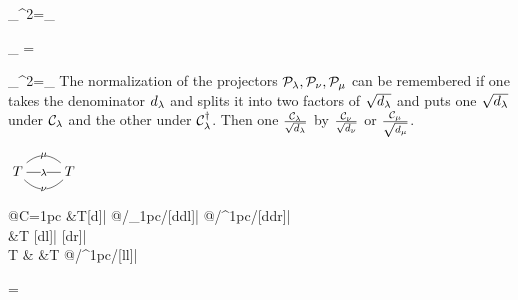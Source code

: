 \beq
\calp_\nu^2=\calp_\nu
\eeq



\beq
{\color{green}\calp_\mu}
=
\bcen
{}
\ecen
\eeq

\beq
\calp_\mu^2=\calp_\mu
\eeq
The normalization of the projectors ${\cal P}_\lambda, {\cal P}_\nu, {\cal P}_\mu$ can be remembered if 
one takes the denominator $d_\lambda$ and splits it into two factors of $\sqrt{d_\lambda}$
and puts one $\sqrt{d_\lambda}$
under ${\cal C}_\lambda$
and the other under ${\cal C}^\dagger_\lambda$. Then
one  $\frac{{\cal C}_\lambda}{\sqrt{d_\lambda}}$
by
$\frac{{\cal C}_\nu}{\sqrt{d_\nu}}$
or
$\frac{{\cal C}_\mu}{\sqrt{d_\mu}}$.


\newcommand{\trij}[3]{
\xymatrix{
T
\ar@{-}@/^1pc/[r]|#1
\ar@{-}@/_1pc/[r]|#3
&T\ar@{-}[l]|#2
}
}

$
\trij{\mu}{\lam}{\nu}
$

\newcommand{\sixj}[6]{
\xymatrix@R=1pc@C=1pc{
&T\ar@{-}[d]|#1
\ar@{-}@/_1pc/[ddl]|#6
\ar@{-}@/^1pc/[ddr]|#5
\\
&T
\ar@{-}[dl]|#2
\ar@{-}[dr]|#3
\\
T
&
&T
\ar@{-}@/^1pc/[ll]|#4
}
}

\sixj{\lam}{\mu}{\nu}{\omega}{\rho}{\s}

\beq
\bcen
{}
\ecen
=
\bcen
{}
\ecen
\eeq

\beq
\bcen
{}
\ecen
\neq
\bcen
{}
\ecen
\eeq